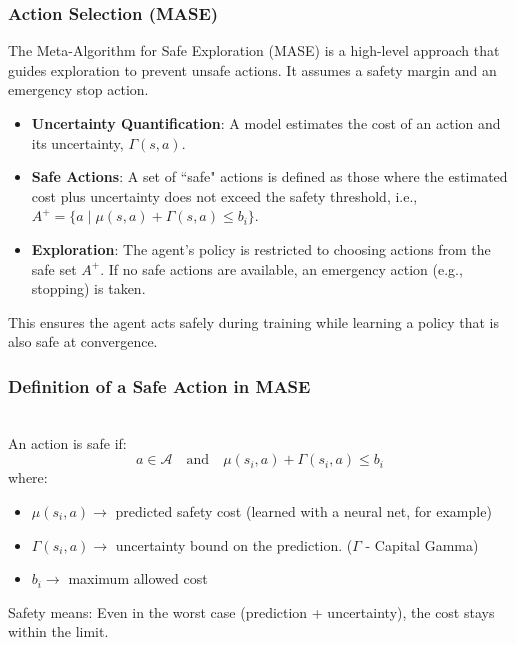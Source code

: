 \documentclass[12pt]{article}
\begin{document}
\subsubsection{Action Selection (MASE)}
The Meta-Algorithm for Safe Exploration (MASE) is a high-level approach that guides exploration to prevent unsafe actions. It assumes a safety margin and an emergency stop action.
\begin{itemize}
    \item \textbf{Uncertainty Quantification}: A model estimates the cost of an action and its uncertainty, $\Gamma(s, a)$.
    \item \textbf{Safe Actions}: A set of ``safe" actions is defined as those where the estimated cost plus uncertainty does not exceed the safety threshold, i.e., $A^+ = \{a \mid \mu(s, a) + \Gamma(s, a) \leq b_i\}$.
    \item \textbf{Exploration}: The agent's policy is restricted to choosing actions from the safe set $A^+$. If no safe actions are available, an emergency action (e.g., stopping) is taken.
\end{itemize}
This ensures the agent acts safely during training while learning a policy that is also safe at convergence.  

\subsubsection*{Definition of a Safe Action in MASE} \\ 
An action is safe if:
\[ a \in \mathcal{A} \quad \text{and} \quad \mu(s_i, a) + \Gamma(s_i, a) \le b_i \]
where:
\begin{itemize}
    \item $\mu(s_i, a) \to$ predicted safety cost (learned with a neural net, for example)
    \item $\Gamma(s_i, a) \to$ uncertainty bound on the prediction. ($\Gamma$ - Capital Gamma)
    \item $b_i \to$ maximum allowed cost
\end{itemize}
Safety means: Even in the worst case (prediction + uncertainty), the cost stays within the limit.
\end{document}
